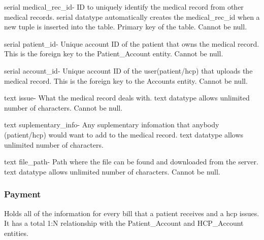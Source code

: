 \documentclass[12pt]{report}
\begin{document}
\begin{description}
\item serial medical\_rec\_id- ID to uniquely identify the medical record from other medical records. serial datatype automatically creates the medical\_rec\_id when a new tuple is inserted into the table.  Primary key of the table.  Cannot be null.
\item serial patient\_id- Unique account ID of the patient that owns the medical record.  This is the foreign key to the Patient\_Account entity.  Cannot be null.
\item serial account\_id- Unique account ID of the user(patient/hcp) that uploads the medical record.  This is the foreign key to the Accounts entity.  Cannot be null.
\item text issue-  What the medical record deals with.  text datatype allows unlimited number of characters.  Cannot be null.
\item text suplementary\_info- Any suplementary infomation that anybody (patient/hcp) would want to add to the medical record.  text datatype allows unlimited number of characters.
\item text file\_path- Path where the file can be found and downloaded from the server.  text datatype allows unlimited number of characters.  Cannot be null.
\end{description}

\subsubsection{Payment}
Holds all of the information for every bill that a patient receives and a hcp issues.  It has a total 1:N relationship with the Patient\_Account and HCP\_Account entities.
\end{document}
